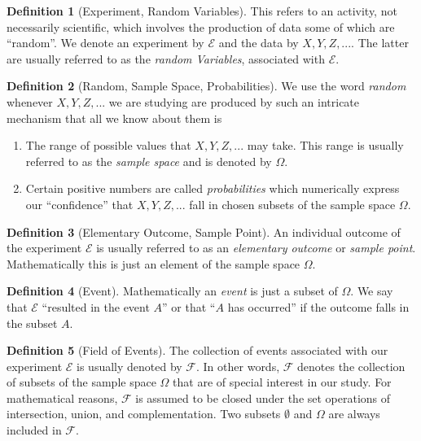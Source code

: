 \documentclass[11pt]{article}
\theoremstyle{definition}\newtheorem{definition}{Definition}
\theoremstyle{definition}\newtheorem{question}{Question}
\theoremstyle{definition}\newtheorem*{solution}{Solution}
\theoremstyle{definition}\newtheorem{example}{Example}
\theoremstyle{definition}\newtheorem{notation}{Notation}
\theoremstyle{theorem}\newtheorem{theorem}{Theorem}
\theoremstyle{theorem}\newtheorem{corollary}{Corollary}
\theoremstyle{theorem}\newtheorem{lemma}{Lemma}
\theoremstyle{theorem}\newtheorem{proposition}{Proposition}
\newcommand{\E}{\mathcal{E}}
\newcommand{\FF}{\mathcal{F}}
\begin{document}
\begin{definition}[Experiment, Random Variables]
    This refers to an activity, not necessarily scientific, which involves the production of data some of which are ``random''. We denote an experiment by $\E$ and the data by $X, Y, Z,...$. The latter are usually referred to as the \emph{random Variables}, associated with $\E$.
\end{definition}

\begin{definition}[Random, Sample Space, Probabilities]
    We use the word \emph{random} whenever $X, Y, Z,...$ we are studying are produced by such an intricate mechanism that all we know about them is
    \begin{enumerate}
        \item The range of possible values that $X, Y, Z,...$ may take. This range is usually referred to as the \emph{sample space} and is denoted by $\Omega$.
        \item Certain positive numbers are called \emph{probabilities} which numerically express our ``confidence'' that $X, Y, Z,...$ fall in chosen subsets of the sample space $\Omega$.
    \end{enumerate}
\end{definition}

\begin{definition}[Elementary Outcome, Sample Point]
    An individual outcome of the experiment $\E$ is usually referred to as an \emph{elementary outcome} or \emph{sample point}. Mathematically this is just an element of the sample space $\Omega$.
\end{definition}

\begin{definition}[Event]
    Mathematically an \emph{event} is just a subset of $\Omega$. We say that $\E$ ``resulted in the event $A$'' or that ``$A$ has occurred'' if the outcome falls in the subset $A$.
\end{definition}

\begin{definition}[Field of Events]
    The collection of events associated with our experiment $\E$ is usually denoted by $\FF$. In other words, $\FF$ denotes the collection of subsets of the sample space $\Omega$ that are of special interest in our study. For mathematical reasons, $\FF$ is assumed to be closed under the set operations of intersection, union, and complementation. Two subsets $\emptyset$ and $\Omega$ are always included in $\FF$.
\end{definition}
\end{document}
